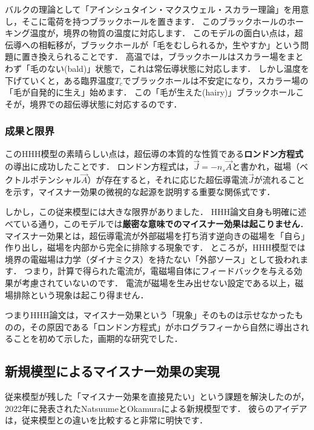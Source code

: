 \documentclass[b5paper,11pt,dvipdfmx]{jsarticle}
\numberwithin{equation}{section}
\theoremstyle{definition}
\begin{document}
バルクの理論として「アインシュタイン・マクスウェル・スカラー理論」を用意し，そこに電荷を持つブラックホールを置きます．
このブラックホールのホーキング温度が，境界の物質の温度に対応します．
このモデルの面白い点は，超伝導への相転移が，ブラックホールが「毛をむしられるか，生やすか」という問題に置き換えられることです．
高温では，ブラックホールはスカラー場をまとわず「毛のない(bald)」状態で，これは常伝導状態に対応します．
しかし温度を下げていくと，ある臨界温度$T_c$でブラックホールは不安定になり，スカラー場の「毛が自発的に生え」始めます．
この「毛が生えた(hairy)」ブラックホールこそが，境界での超伝導状態に対応するのです．

\subsubsection*{成果と限界}

このHHH模型の素晴らしい点は，超伝導の本質的な性質である\textbf{ロンドン方程式}の導出に成功したことです\cite{Hartnoll08b}．
ロンドン方程式は，$ \vec{J} = -n_s \vec{A} $と書かれ，磁場（ベクトルポテンシャル$\vec{A}$）が存在すると，それに応じた超伝導電流$\vec{J}$が流れることを示す，マイスナー効果の微視的な起源を説明する重要な関係式です．

しかし，この従来模型には大きな限界がありました．
HHH論文自身も明確に述べている通り，このモデルでは\textbf{厳密な意味でのマイスナー効果は起こりません}．
マイスナー効果とは，超伝導電流が外部磁場を打ち消す逆向きの磁場を「自ら」作り出し，磁場を内部から完全に排除する現象です．
ところが，HHH模型では境界の電磁場は力学（ダイナミクス）を持たない「外部ソース」として扱われます．
つまり，計算で得られた電流が，電磁場自体にフィードバックを与える効果が考慮されていないのです．
電流が磁場を生み出せない設定である以上，磁場排除という現象は起こり得ません．

つまりHHH論文は，マイスナー効果という「現象」そのものは示せなかったものの，その原因である「ロンドン方程式」がホログラフィーから自然に導出されることを初めて示した，画期的な研究でした．

\subsection{新規模型によるマイスナー効果の実現}

従来模型が残した「マイスナー効果を直接見たい」という課題を解決したのが，2022年に発表されたNatsuumeとOkamuraによる新規模型です\cite{Natsuume22}．
彼らのアイデアは，従来模型との違いを比較すると非常に明快です．
\end{document}
